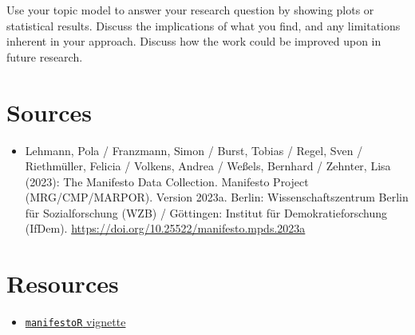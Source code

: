 \documentclass[
]{article}
\providecommand{\tightlist}{%
  \setlength{\itemsep}{0pt}\setlength{\parskip}{0pt}}
\begin{document}
Use your topic model to answer your research question by showing plots
or statistical results. Discuss the implications of what you find, and
any limitations inherent in your approach. Discuss how the work could be
improved upon in future research.

\begin{quote}
\end{quote}

\hypertarget{sources}{%
\section{Sources}\label{sources}}

\begin{itemize}
\tightlist
\item
  Lehmann, Pola / Franzmann, Simon / Burst, Tobias / Regel, Sven /
  Riethmüller, Felicia / Volkens, Andrea / Weßels, Bernhard / Zehnter,
  Lisa (2023): The Manifesto Data Collection. Manifesto Project
  (MRG/CMP/MARPOR). Version 2023a. Berlin: Wissenschaftszentrum Berlin
  für Sozialforschung (WZB) / Göttingen: Institut für
  Demokratieforschung (IfDem).
  \url{https://doi.org/10.25522/manifesto.mpds.2023a}
\end{itemize}

\hypertarget{resources}{%
\section{Resources}\label{resources}}

\begin{itemize}
\tightlist
\item
  \href{https://cran.r-project.org/web/packages/manifestoR/vignettes/manifestoRworkflow.pdf}{\texttt{manifestoR}
  vignette}
\end{itemize}

  
\end{document}
